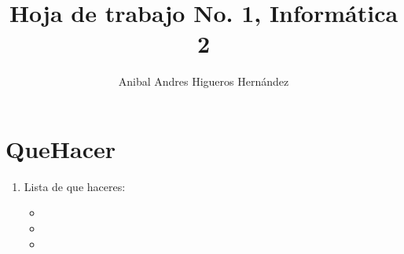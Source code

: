 \documentclass{article}
\begin{document}
    \usepackage{color}

        \title{Hoja de trabajo No. 1, Informática 2}
        \author{Anibal Andres Higueros Hernández}
        \maketitle
        
        \section{QueHacer}
        \begin{enumerate}
            \item Lista de que haceres: 
            \begin{itemize}
                \item
                \item
                \item
            \end{itemize}
        \end{enumerate}
    
\end{document}
